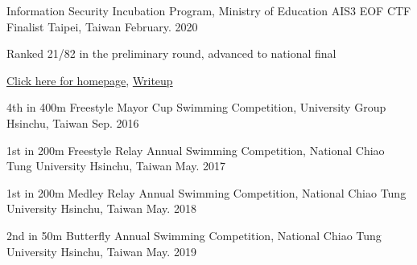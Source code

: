 \begin{cventries}
\cventry
    {Information Security Incubation Program, Ministry of Education} %
    {AIS3 EOF CTF Finalist} %
    {Taipei, Taiwan} %
    {February. 2020} %
    {
      \begin{cvitems} %
        \item {Ranked 21/82 in the preliminary round, advanced to national final}
        \item {\href{https://ais3.org/eof/Home/FinalResult}{Click here for homepage}, \href{https://github.com/Alfons0329/CS_Fall_2019/tree/master/Final_CTF}{Writeup}}
      \end{cvitems}
    }
\end{cventries}

\begin{cvhonors}

  \cvhonor
    {4th in 400m Freestyle} %
    {Mayor Cup Swimming Competition, University Group} %
    {Hsinchu, Taiwan} %
    {Sep. 2016} %

  \cvhonor
    {1st in 200m Freestyle Relay} %
    {Annual Swimming Competition, National Chiao Tung University} %
    {Hsinchu, Taiwan} %
    {May. 2017} %

  \cvhonor
    {1st in 200m Medley Relay} %
    {Annual Swimming Competition, National Chiao Tung University} %
    {Hsinchu, Taiwan} %
    {May. 2018} %
    
  \cvhonor
    {2nd in 50m Butterfly} %
    {Annual Swimming Competition, National Chiao Tung University} %
    {Hsinchu, Taiwan} %
    {May. 2019} %
    
\end{cvhonors}
